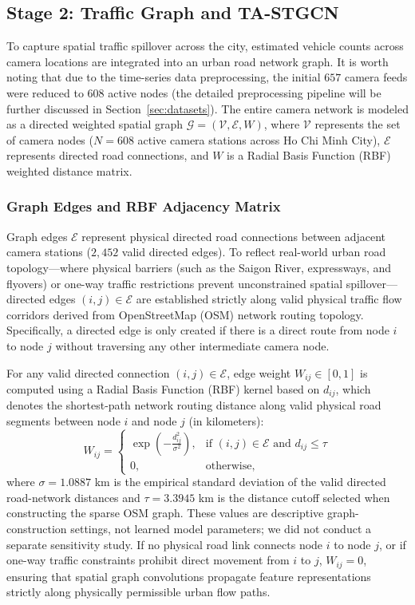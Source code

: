 \documentclass[a4paper,fleqn]{cas-sc}
\begin{document}
\subsection{Stage 2: Traffic Graph and TA-STGCN}
\label{sec:stage2}
\label{sec:graph_tastgcn}

To capture spatial traffic spillover across the city, estimated vehicle counts across camera locations are integrated into an urban road network graph. It is worth noting that due to the time-series data preprocessing, the initial $657$ camera feeds were reduced to $608$ active nodes (the detailed preprocessing pipeline will be further discussed in Section~\ref{sec:datasets}). The entire camera network is modeled as a directed weighted spatial graph $\mathcal{G} = (\mathcal{V}, \mathcal{E}, W)$, where $\mathcal{V}$ represents the set of camera nodes ($N=608$ active camera stations across Ho Chi Minh City), $\mathcal{E}$ represents directed road connections, and $W$ is a Radial Basis Function (RBF) weighted distance matrix.

\subsubsection{Graph Edges and RBF Adjacency Matrix}
Graph edges $\mathcal{E}$ represent physical directed road connections between adjacent camera stations ($2,452$ valid directed edges). To reflect real-world urban road topology—where physical barriers (such as the Saigon River, expressways, and flyovers) or one-way traffic restrictions prevent unconstrained spatial spillover—directed edges $(i,j) \in \mathcal{E}$ are established strictly along valid physical traffic flow corridors derived from OpenStreetMap (OSM) network routing topology. Specifically, a directed edge is only created if there is a direct route from node $i$ to node $j$ without traversing any other intermediate camera node.

For any valid directed connection $(i,j) \in \mathcal{E}$, edge weight $W_{ij} \in [0, 1]$ is computed using a Radial Basis Function (RBF) kernel based on $d_{ij}$, which denotes the shortest-path network routing distance along valid physical road segments between node $i$ and node $j$ (in kilometers):
\begin{equation}
W_{ij} = \begin{cases} \exp\left(-\frac{d_{ij}^2}{\sigma^2}\right), & \text{if } (i,j) \in \mathcal{E} \text{ and } d_{ij} \le \tau \\ 0, & \text{otherwise,} \end{cases}
\end{equation}
where $\sigma = 1.0887$ km is the empirical standard deviation of the valid directed road-network distances and $\tau = 3.3945$ km is the distance cutoff selected when constructing the sparse OSM graph. These values are descriptive graph-construction settings, not learned model parameters; we did not conduct a separate sensitivity study. If no physical road link connects node $i$ to node $j$, or if one-way traffic constraints prohibit direct movement from $i$ to $j$, $W_{ij} = 0$, ensuring that spatial graph convolutions propagate feature representations strictly along physically permissible urban flow paths.
\end{document}
